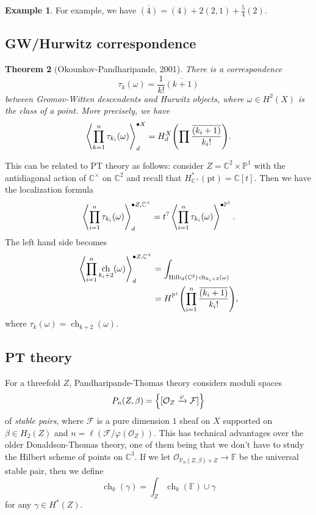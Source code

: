 \documentclass[leqno, openany]{memoir}
\newtheorem{thm}{Theorem}[section]
\theoremstyle{definition}
\newtheorem{exm}[thm]{Example}
\theoremstyle{remark}
\theoremstyle{plain}
\theoremstyle{definition}
\theoremstyle{remark}
\newcommand{\F}{\mathbb{F}}
\newcommand{\C}{\mathbb{C}}
\renewcommand{\P}{\mathbb{P}}
\newcommand{\mc}[1]{\mathcal{#1}}
\newcommand{\mr}[1]{\mathrm{#1}}
\newcommand{\ol}[1]{\overline{#1}}
\DeclareMathOperator{\ch}{ch}
\begin{document}
\begin{exm}
    For example, we have $\overline{(4)} = (4) + 2(2,1) + \frac{5}{4} (2)$.
\end{exm}

\subsection{GW/Hurwitz correspondence}

\begin{thm}[Okounkov-Pandharipande, 2001]\label{thm:op01}
    There is a correspondence
    \[ \tau_k(\omega) = \frac{1}{k!} \ol{(k+1)} \]
    between Gromov-Witten descendents and Hurwitz objects, where $\omega \in H^2(X)$ is the class of a point. More precisely, we have
    \[ \ev{\prod_{k=1}^n \tau_{k_i}(\omega)}_d^{\bullet X} = H_d^X \qty(\prod \frac{\ol{(k_i+1)}}{k_i!}). \]
\end{thm}

This can be related to PT theory as follows: consider $Z = \C^2 \times \P^1$ with the antidiagonal action of $\C^{\times}$ on $\C^2$ and recall that $H_{\C^{\times}}^*(\mr{pt}) = \C[t]$. Then we have the localization formula
\[ \ev{\prod_{i=1}^n \tau_{k_i}(\omega)}_d^{\bullet Z, \C^{\times}} = t^? \ev{\prod_{i=1}^n \tau_{k_i}(\omega)}^{\bullet \P^1}. \]
The left hand side becomes
\begin{align*}
    \ev{\prod_{i=1}^n \ch_{k_i+2}(\omega)}^{\bullet Z, \C^{\times}}_d &= \int_{\mr{Hilb}_d(\C^2) \ch_{k_i+2}(\omega)} \\
    &= H^{\P^1} \qty(\prod_{i=1}^n \frac{\ol{(k_i+1)}}{k_i!}),
\end{align*}
where $\tau_k(\omega) = \ch_{k+2}(\omega)$.

\subsection{PT theory}

For a threefold $Z$, Pandharipande-Thomas theory considers moduli spaces
\[ P_n(Z, \beta) = \qty{[\mc{O}_Z \xrightarrow{\varphi} \mc{F}]} \]
of \textit{stable pairs}, where $\mc{F}$ is a pure dimension $1$ sheaf on $X$ supported on $\beta \in H_2(Z)$ and $n = \ell(\mc{F}/\varphi(\mc{O}_Z))$. This has technical advantages over the older Donaldson-Thomas theory, one of them being that we don't have to study the Hilbert scheme of points on $\C^3$. If we let $\mc{O}_{\P_n(Z, \beta) \times Z} \to \F$ be the universal stable pair, then we define
\[ \ch_k(\gamma) = \int_Z \ch_k(\F) \cup \gamma \] for any $\gamma \in H^*(Z)$.
\end{document}
